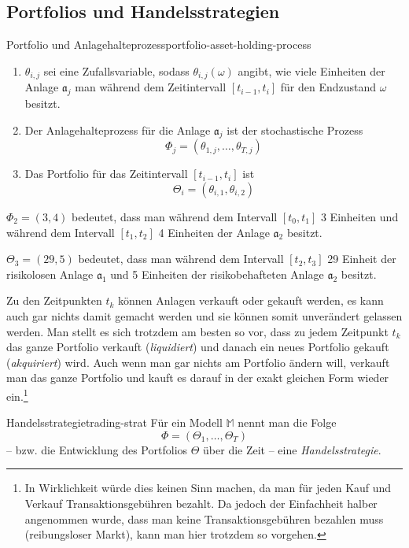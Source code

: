 \documentclass[11pt]{report} %
\begin{document}
\subsection{Portfolios und Handelsstrategien}
\begin{Definition}{Portfolio und Anlagehalteprozess}{portfolio-asset-holding-process}
    \begin{enumerate}
        \item $\theta_{i, j}$ sei eine Zufallsvariable, sodass $\theta_{i, j}(\omega)$ angibt, wie viele Einheiten der Anlage $\mathfrak{a}_j$ man während dem Zeitintervall $[t_{i-1}, t_i]$ für den Endzustand $\omega$ besitzt.
        \item Der Anlagehalteprozess für die Anlage $\mathfrak{a}_j$ ist der stochastische Prozess $$\Phi_j=(\theta_{1, j}, \ldots, \theta_{T, j})$$
        \item Das Portfolio für das Zeitintervall $[t_{i-1}, t_i]$ ist $$\Theta_i=(\theta_{i, 1}, \theta_{i, 2})$$
    \end{enumerate}
\end{Definition}
 \begin{Beispiel}{}{}
     $\Phi_2=(3, 4)$ bedeutet, dass man während dem Intervall $[t_0, t_1]$ 3 Einheiten und während dem Intervall $[t_1, t_2]$ 4 Einheiten der Anlage $\mathfrak{a}_2$ besitzt.
 \end{Beispiel}
\begin{Beispiel}{}{}
    $\Theta_3=(29, 5)$ bedeutet, dass man  während dem Intervall $[t_2, t_3]$ 29 Einheit der risikolosen Anlage $\mathfrak{a}_1$ und 5 Einheiten der risikobehafteten Anlage $\mathfrak{a}_2$ besitzt.
\end{Beispiel}
 Zu den Zeitpunkten $t_k$ können Anlagen verkauft oder gekauft werden, es kann auch gar nichts damit gemacht werden und sie können somit unverändert gelassen werden. Man stellt es sich trotzdem am besten so vor, dass zu jedem Zeitpunkt $t_k$ das ganze Portfolio verkauft (\textit{liquidiert}) und danach ein neues Portfolio gekauft (\textit{akquiriert}) wird. Auch wenn man gar nichts am Portfolio ändern will, verkauft man das ganze Portfolio und kauft es darauf in der exakt gleichen Form wieder ein.\footnote{In Wirklichkeit würde dies keinen Sinn machen, da man für jeden Kauf und Verkauf Transaktionsgebühren bezahlt. Da jedoch der Einfachheit halber angenommen wurde, dass man keine Transaktionsgebühren bezahlen muss (reibungsloser Markt), kann man hier trotzdem so vorgehen.}
 \begin{Definition}{Handelsstrategie}{trading-strat}
     Für ein Modell $\mathbb{M}$ nennt man die Folge $$\Phi=(\Theta_1, \ldots, \Theta_T)$$ -- bzw. die Entwicklung des Portfolios $\Theta$ über die Zeit -- eine \textit{Handelsstrategie}.
 \end{Definition}
\end{document}
